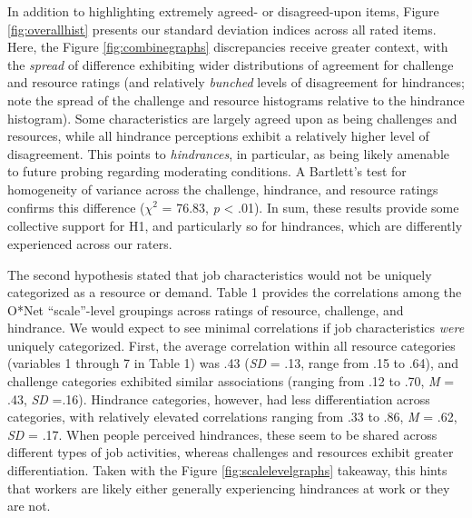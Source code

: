 \documentclass[
  man,mask]{apa7}
\begin{document}
In addition to highlighting extremely agreed- or disagreed-upon items, Figure \ref{fig:overallhist} presents our standard deviation indices across all rated items. Here, the Figure \ref{fig:combinegraphs} discrepancies receive greater context, with the \emph{spread} of difference exhibiting wider distributions of agreement for challenge and resource ratings (and relatively \emph{bunched} levels of disagreement for hindrances; note the spread of the challenge and resource histograms relative to the hindrance histogram). Some characteristics are largely agreed upon as being challenges and resources, while all hindrance perceptions exhibit a relatively higher level of disagreement. This points to \emph{hindrances}, in particular, as being likely amenable to future probing regarding moderating conditions. A Bartlett's test for homogeneity of variance across the challenge, hindrance, and resource ratings confirms this difference (\(\chi^2_{}\) = 76.83, \emph{p} \textless{} .01). In sum, these results provide some collective support for H1, and particularly so for hindrances, which are differently experienced across our raters.

The second hypothesis stated that job characteristics would not be uniquely categorized as a resource or demand. Table 1 provides the correlations among the O*Net ``scale''-level groupings across ratings of resource, challenge, and hindrance. We would expect to see minimal correlations if job characteristics \emph{were} uniquely categorized. First, the average correlation within all resource categories (variables 1 through 7 in Table 1) was .43 (\emph{SD} = .13, range from .15 to .64), and challenge categories exhibited similar associations (ranging from .12 to .70, \emph{M} = .43, \emph{SD} =.16). Hindrance categories, however, had less differentiation across categories, with relatively elevated correlations ranging from .33 to .86, \emph{M} = .62, \emph{SD} = .17. When people perceived hindrances, these seem to be shared across different types of job activities, whereas challenges and resources exhibit greater differentiation. Taken with the Figure \ref{fig:scalelevelgraphs} takeaway, this hints that workers are likely either generally experiencing hindrances at work or they are not.
\end{document}
